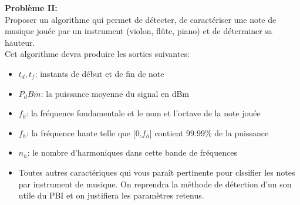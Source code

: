 
  \textbf{Problème II:} \  \\
  Proposer un algorithme qui permet de détecter, de caractériser une note de musique jouée par un instrument (violon, flûte, piano) et de déterminer sa hauteur. \\
  Cet algorithme devra produire les sorties suivantes: \\
  \begin{itemize}
    \item $t_d, t_f$: instants de début et de fin de note
    \item $P_dBm$: la puissance moyenne du signal en dBm
    \item $f_0$: la fréquence fondamentale et le nom et l'octave de la note jouée
    \item $f_h$: la fréquence haute telle que [0,$f_h$] contient 99.99\% de la puissance
    \item $n_h$: le nombre d'harmoniques dans cette bande de fréquences
    \item Toutes autres caractériques qui vous  paraît pertinente pour clssifier les notes par instrument de musique.
    On reprendra la méthode de détection d'un son utile du PBI et on justifiera les paramètres retenus.
  \end{itemize}

  
